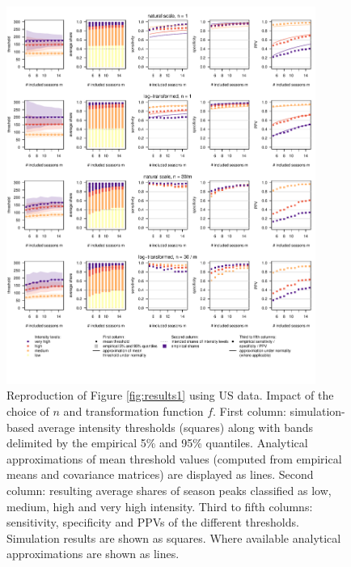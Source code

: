 \documentclass[12pt]{article}
\begin{document}
\begin{figure}[h!]
\centering
\includegraphics[width=0.9\textwidth]{figure/plot_us.pdf}

\vspace{-1.5cm}

\caption{Reproduction of Figure \ref{fig:results1} using US data. Impact of the choice of $n$ and transformation function $f$. First column: simulation-based average intensity thresholds (squares) along with bands delimited by the empirical 5\% and 95\% quantiles. Analytical approximations of mean threshold values (computed from empirical means and covariance matrices) are displayed as lines. Second column: resulting average shares of season peaks classified as low, medium, high and very high intensity. Third to fifth columns: sensitivity, specificity and PPVs of the different thresholds. Simulation results are shown as squares. Where available analytical approximations are shown as lines.}
\label{fig:results1_us}
\end{figure}

\newpage
\end{document}
